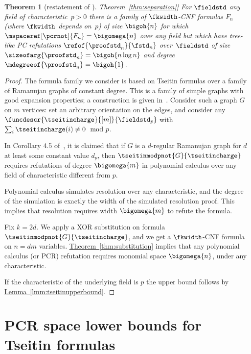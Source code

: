 \documentclass[11pt]{article}
\numberwithin{equation}{section}
\newtheorem{theorem}{Theorem}[section]
\theoremstyle{definition}
\theoremstyle{plain}
\newcommand{\expref}[2]{\hyperref[#2]{#1~\ref{#2}}}
\begin{document}
\begin{theorem}[restatement of \expref{Theorem}{thm:separation}]
  For $\fieldstd$ any field of characteristic~$p>0$
  there is a family of
  \mbox{$\fkwidth$-CNF} formulas
  $F_n$
  (where $\fkwidth$ depends on~$p$)
  of size $\bigoh{n}$
  for which
%
  $\mspaceref[\pcrnot]{F_{n}}=\bigomega{n}$
  over any field
  but  which have tree-like PC refutations
  $\refof{\proofstd_n}{\fstd_n}$ 
  over~$\fieldstd$
  of size
  $\sizeofarg{\proofstd_n}=\bigoh{n\log n}$
  and degree
  $\mdegreeof{\proofstd_n}=\bigoh{1}$.
\end{theorem}
\begin{proof}
  The formula family we consider is based on Tseitin formulas over a
  family of Ramanujan graphs of constant degree. This is a family of
  simple graphs with good expansion properties; a construction is
  given in~\cite{Morgenstern1994}.  Consider such a graph $G$ on $m$
  vertices: set an arbitrary orientation on the edges, and consider
  any $\funcdescr{\tseitincharge}{[m]}{\fieldstd_p}$ with
  $\sum_{i}\tseitincharge(i)\not=0 \mod{p}$.
  
  In Corollary 4.5 of~\cite{AR03LowerBounds}, it is claimed that if
  $G$ is a $d$-regular Ramanujan graph for $d$ at least some constant value
  $d_{p}$, then $\tseitinmodpnot{G}{\tseitincharge}$ requires
  refutations of degree $\bigomega{m}$ in polynomial calculus over any
  field of characteristic different from $p$.

  Polynomial calculus simulates resolution over any characteristic,
  and the degree of the simulation is exactly the width of the
  simulated resolution proof. This implies that resolution requires
  width $\bigomega{m}$ to refute the formula.

  Fix $k=2d$. We apply a XOR substitution on formula
  $\tseitinmodpnot{G}{\tseitincharge}$, and 
  we get a $\fkwidth$-CNF formula on $n=dm$
  variables. \expref{Theorem}{thm:substitution} implies that any polynomial calculus (or PCR) refutation requires monomial space $\bigomega{n}$, under
  any characteristic.

  If the characteristic of the underlying field is $p$ the upper bound
  follows by \expref{Lemma}{lmm:tseitinupperbound}.
\end{proof}

%
%
%
\section{PCR space lower bounds for Tseitin formulas}
\label{sec:small-cycles}
\end{document}
